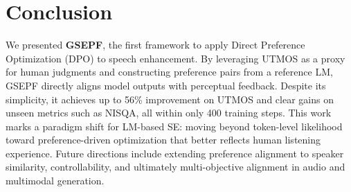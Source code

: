 \documentclass{article}
\begin{document}
\section{Conclusion}
We presented \textbf{GSEPF}, the first framework to apply Direct Preference Optimization (DPO) to speech enhancement. By leveraging UTMOS as a proxy for human judgments and constructing preference pairs from a reference LM, GSEPF directly aligns model outputs with perceptual feedback. Despite its simplicity, it achieves up to 56\% improvement on UTMOS and clear gains on unseen metrics such as NISQA, all within only 400 training steps. This work marks a paradigm shift for LM-based SE: moving beyond token-level likelihood toward preference-driven optimization that better reflects human listening experience. Future directions include extending preference alignment to speaker similarity, controllability, and ultimately multi-objective alignment in audio and multimodal generation. 

\vfill\pagebreak
\clearpage

\footnotesize


\end{document}
